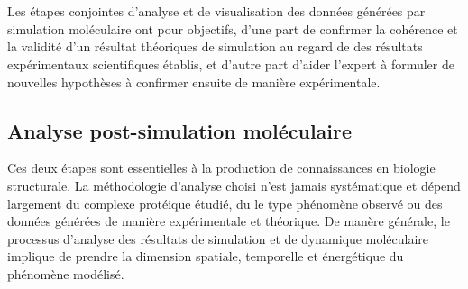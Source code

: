 
\chapter[La visualisation analytique, outil de la Réalité Virtuelle]{}
\label{Sec:VisuAna_def}
\minitoc
\cleardoublepage


Les étapes conjointes d'analyse et de visualisation des données générées par simulation moléculaire ont pour objectifs, d'une part de confirmer la cohérence et la validité d'un résultat théoriques de simulation au regard de des résultats expérimentaux scientifiques établis, et d'autre part d'aider l'expert à formuler de nouvelles hypothèses à confirmer ensuite de manière expérimentale. 


\section{Analyse post-simulation moléculaire}

Ces deux étapes sont essentielles à la production de connaissances en biologie structurale. La méthodologie d'analyse choisi n'est jamais systématique et dépend largement du complexe protéique étudié, du le type phénomène observé ou des données générées de manière expérimentale et théorique. De manère générale, le processus d'analyse des résultats de simulation et de dynamique moléculaire implique de prendre la dimension spatiale, temporelle et énergétique du phénomène modélisé.




